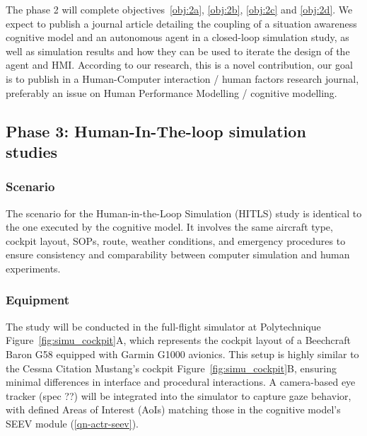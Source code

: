 \documentclass[12pt,a4paper]{article} %
\begin{document}
	The phase 2 will complete objectives~\ref{obj:2a}, \ref{obj:2b}, \ref{obj:2c} and \ref{obj:2d}. We expect to publish a journal article detailing the coupling of a situation awareness cognitive model and an autonomous agent in a closed-loop simulation study, as well as simulation results and how they can be used to iterate the design of the agent and HMI. According to our research, this is a novel contribution, our goal is to publish in a Human-Computer interaction / human factors research journal, preferably an issue on Human Performance Modelling / cognitive modelling.

	\subsection{Phase 3: Human-In-The-loop simulation studies}

	\subsubsection{Scenario}
	The scenario for the Human-in-the-Loop Simulation (HITLS) study is identical to the one executed by the cognitive model. It involves the same aircraft type, cockpit layout, SOPs, route, weather conditions, and emergency procedures to ensure consistency and comparability between computer simulation and human experiments.

	\subsubsection{Equipment}
	The study will be conducted in the full-flight simulator at Polytechnique Figure~\ref{fig:simu_cockpit}A, which represents the cockpit layout of a Beechcraft Baron G58 equipped with Garmin G1000 avionics. This setup is highly similar to the Cessna Citation Mustang's cockpit Figure~\ref{fig:simu_cockpit}B, ensuring minimal differences in interface and procedural interactions. A camera-based eye tracker (spec ??) will be integrated into the simulator to capture gaze behavior, with defined Areas of Interest (AoIs) matching those in the cognitive model's SEEV module (\ref{qn-actr-seev}).
\end{document}
